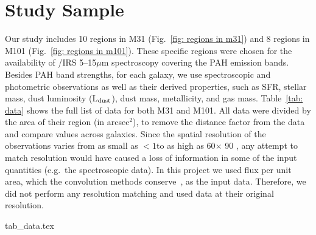 \section{Study Sample}
\label{Sec: data_SOMN}

Our study includes 10 regions in M31 (Fig.~\ref{fig: regions in m31}) and 8 regions in M101 (Fig.~\ref{fig: regions in m101}). 
These specific regions were chosen for the availability of \Spitzer/IRS 5--15$\mu$m spectroscopy covering the PAH emission bands.
Besides PAH band strengths, for each galaxy, we use spectroscopic and photometric observations as well as their derived properties, such as SFR, stellar mass, dust luminosity (L$_{\rm dust}$), dust mass, metallicity, and gas mass.
Table~\ref{tab: data} shows the full list of data for both M31 and M101.
All data were divided by the area of their region (in arcsec$^2$), to remove the distance factor from the data and compare values across galaxies.
Since the spatial resolution of the observations varies from as small as $<1$\arcsec to as high as 60\arcsec $\times$ 90 \arcsec, any attempt to match resolution would have caused a loss of information in some of the input quantities (e.g.\ the spectroscopic data).
In this project we used flux per unit area, which the convolution methods conserve~\citep{Aniano12}, as the input data.
Therefore, we did not perform any resolution matching and used data at their original resolution.

    {tab_data.tex}

